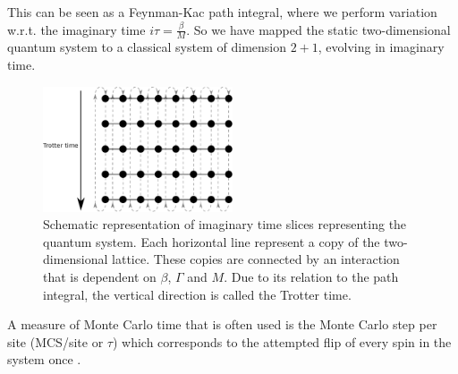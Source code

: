 This can be seen as a Feynman-Kac path integral, where we perform variation w.r.t. the imaginary time $i\tau = \frac{\beta}{M}$. So we have mapped the static two-dimensional quantum system to a classical system of dimension $2+1$, evolving in imaginary time. 
\begin{figure}
    \centering
    \includegraphics[width = 0.5\textwidth]{figures/chapter2/trotter.eps}
    \caption{Schematic representation of imaginary time slices representing the quantum system. Each horizontal line represent a copy of the two-dimensional lattice. These copies are connected by an interaction that is dependent on $\beta$, $\Gamma$ and $M$. Due to its relation to the path integral, the vertical direction is called the Trotter time.}
    \label{fig:trotter}
\end{figure}
A measure of Monte Carlo time that is often used is the Monte Carlo step per site (MCS/site or $\tau$) which corresponds to the attempted flip of every spin in the system once \cite{landau2014}. \newline

